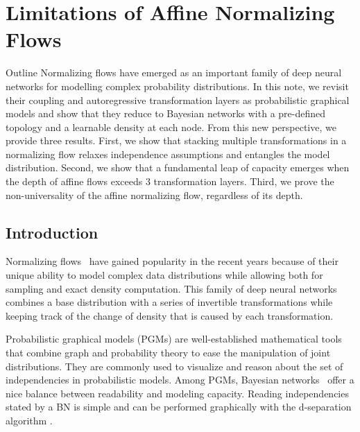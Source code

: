 \chapter{Limitations of Affine Normalizing Flows}\label{ch:04}

\begin{remark}{Outline}
Normalizing flows have emerged as an important family of deep neural networks for modelling complex probability distributions.
In this note, we revisit their coupling and autoregressive transformation layers as probabilistic graphical models and show that they reduce to Bayesian networks  with a pre-defined topology and a learnable density at each node.
From this new perspective, we provide three results.
First, we show that stacking multiple transformations in a normalizing flow relaxes independence assumptions and entangles the model distribution.
Second, we show that a fundamental leap of capacity emerges when the depth of affine flows exceeds 3 transformation layers.
Third, we prove the non-universality of the affine normalizing flow, regardless of its depth.
\end{remark}
\section{Introduction}
Normalizing flows~\citep[NF, ][]{rezende2015variational} have gained popularity in the recent years because of their unique ability to model complex data distributions while allowing both for sampling and exact density computation.
This family of deep neural networks combines a base distribution with a series of invertible transformations while keeping track of the change of density that is caused by each transformation.



Probabilistic graphical models (PGMs) are well-established mathematical tools that combine graph and probability theory to ease the manipulation of joint distributions. They are commonly used to visualize and reason about the set of independencies in probabilistic models.
Among PGMs, Bayesian networks~\citep[BN, ][]{pearl_bayesian_2011} offer a nice balance between readability and modeling capacity. Reading independencies stated by a BN is simple and can be performed graphically with the d-separation algorithm \citep{geiger_d-separation_1990}. %

